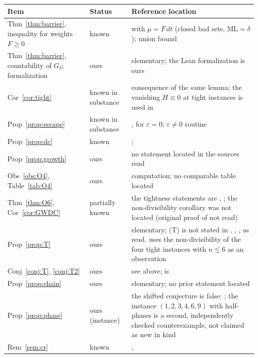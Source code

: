 \documentclass[11pt]{article}
\theoremstyle{remark}
\newcommand{\ML}{\mathrm{ML}}
\begin{document}
\begin{center}\footnotesize
\begin{tabular}{@{}p{3.1cm}p{1.9cm}p{6.2cm}@{}}
\toprule
Item & Status & Reference location\\
\midrule
Thm~\ref{thm:barrier}, inequality for weights $F\ge0$ & known & \cite[Lemma~2.1]{Bedert25} with $\mu=F\,dt$ (closed bad sets, $\ML=\delta$); union bound \cite[Prop.~1.1]{Tao18}\\
Thm~\ref{thm:barrier}, countability of $G_\delta$; formalization & ours & elementary; the Lean formalization is ours\\
Cor~\ref{cor:tight} & known in substance & consequence of the same lemma; the vanishing $H\equiv0$ at tight instances is used in \cite[proof of Thm.~2.1]{BE26}\\
Prop~\ref{prop:escape} & known in substance & \cite[Def.~3]{Trak26}, \cite{Rosenfeld25} for $\varepsilon=0$; $\varepsilon\ne0$ routine\\
Prop~\ref{prop:dc} & known & \cite[Lemma~5.1(i)]{Tao18}; \cite[Lemma~2.3]{Zhang26}\\
Prop~\ref{prop:growth} & ours & no statement located in the sources read\\
Obs~\ref{obs:O4}, Table~\ref{tab:O4} & ours & computation; no comparable table located\\
Thm~\ref{thm:O6}, Cor~\ref{cor:GWDC} & partially known & the tightness statements are \cite[Thm.~3.1, 2.3]{GW06}, \cite[Thm.~1.1, 1.2, 5.1]{Zhang26}; the non-divisibility corollary was not located (original proof of \cite{GW06} not read)\\
Prop~\ref{prop:T} & ours & elementary; (T) is not stated in \cite{Kravitz21}, \cite{Zhang26}, \cite{Cordella26}, \cite{PS25} as read. \cite[Thm.~4.2]{Cordella26} uses the non-divisibility of the four tight instances with $n\le6$ as an observation\\
Conj~\ref{conj:T}, \ref{conj:T2} & ours & see above; \cite[Cor.~2.3 for $E_m$]{Kravitz21} is \cite[Thm.~5.1]{Kravitz21}\\
Prop~\ref{prop:chain} & ours & elementary; no prior statement located\\
Prop~\ref{prop:phase} & ours (instance) & the shifted conjecture is false: \cite[Thm.~1.8]{BCS26}; the instance $(1,2,3,4,6,9)$ with half-phases is a second, independently checked counterexample, not claimed as new in kind\\
Rem~\ref{rem:cr} & known & \cite[Prop.~1.7]{BCS26}, \cite[Prop.~2.7, Lemma~2.5]{MSS25}\\

\end{tabular}
\end{center}
\end{document}
